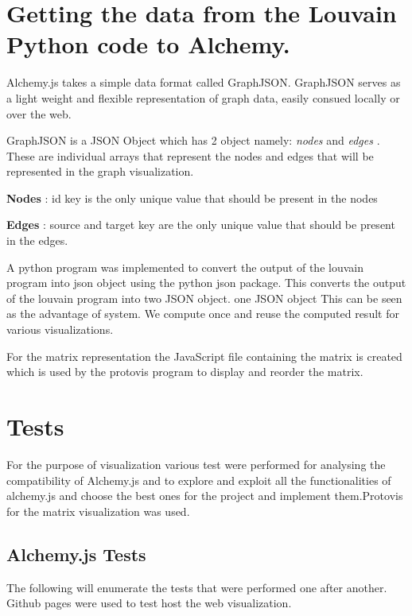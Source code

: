 \section{Getting the data from the Louvain Python code to Alchemy. }
 Alchemy.js takes a simple data format called GraphJSON. GraphJSON serves as a light weight and flexible representation of graph data, easily consued locally or over the web. 
\par 
GraphJSON is a JSON Object which has 2 object namely: \textit{nodes} and  \textit{edges} . These are individual arrays that represent the nodes and edges that will be represented in the graph visualization. 
\par \textbf{Nodes} : id key is the only unique value that should be present in the nodes
\par \textbf{Edges} : source and target key are the only unique value that should be present in the edges.
\par A python program was implemented to convert the output of the louvain program into json object using the python json package. This converts the output of the louvain program into two JSON object. one JSON object 
This can be seen as the advantage of system. We compute once and reuse the computed result for various visualizations.
\par For the matrix representation the JavaScript file containing the matrix is created which is used by the protovis program to display and reorder the matrix.

\section{Tests}
For the purpose of visualization various test were performed for analysing the compatibility of Alchemy.js and to explore and exploit all the functionalities of alchemy.js and choose the best ones for the project and implement them.Protovis for the matrix visualization was used.
\subsection{Alchemy.js Tests}
The following will enumerate the tests that were performed one after another. Github pages were used to test host the web visualization.

